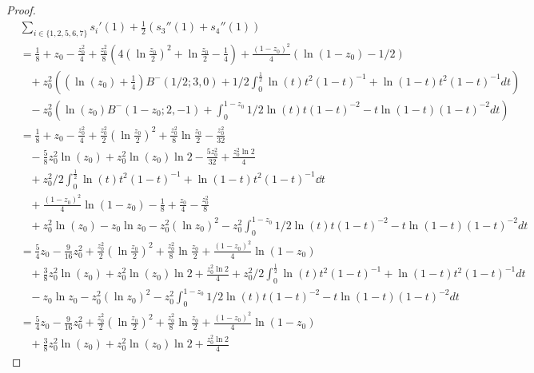 \begin{proof}
\begin{align*}
&\sum_{i \in\{1,2,5,6,7\}} s_i'(1)+\frac{1}{2}(s_3''(1)+s_4''(1))\\
	&=\frac{1}{8}+z_0-\frac{z_0^2}{4}+\frac{z_0^2}{8}(4(\ln\frac{z_0}{2})^2+\ln\frac{z_0}{2} - \frac{1}{4}) 
		+\frac{(1-z_0)^2}{4} (\ln(1-z_0)-1/2 )\\
	&\hspace{10pt}+z_0^2\left(\left(\ln(z_0)+\frac{1}{4}\right) B^-(1/2;3,0)+1/2\int_0^{\frac{1}{2}} 
		\ln(t)t^2(1-t)^{-1}+\ln(1-t)t^2(1-t)^{-1}dt \right) \\
	&\hspace{10pt}- z_0^{2}\left(\ln(z_0)B^-(1-z_0;2,-1)+\int_0^{1-z_0} 1/2\ln(t)t(1-t)^{-2}-t\ln(1-t)(1-t)^{-2}dt \right) \\
	&=\frac{1}{8}+z_0-\frac{z_0^2}{4}+\frac{z_0^2}{2}(\ln\frac{z_0}{2})^2
		+\frac{z_0^2}{8}\ln\frac{z_0}{2} - \frac{z_0^2}{32} \\
	&\hspace{10pt}-\frac{5}{8}z_0^2\ln(z_0)+z_0^2\ln(z_0)\ln 2-\frac{5z_0^2}{32} +\frac{z_0^2 \ln2}{4}\\
	&\hspace{10pt}+z_0^2/2\int_0^{\frac{1}{2}} \ln(t)t^2(1-t)^{-1}+\ln(1-t)t^2(1-t)^{-1}\dd t \\
	&\hspace{10pt}+\frac{(1-z_0)^2}{4}\ln(1-z_0) -\frac{1}{8}+\frac{z_0}{4}-\frac{z_0^2}{8}\\
	&\hspace{10pt}+ z_0^2\ln(z_0)-z_0 \ln z_0-z_0^2(\ln z_0)^2
		-z_0^2\int_0^{1-z_0} 1/2\ln(t)t(1-t)^{-2}-t\ln(1-t)(1-t)^{-2}dt \\
	&=\frac{5}{4}z_0-\frac{9}{16}z_0^2 +\frac{z_0^2}{2}(\ln\frac{z_0}{2})^2+\frac{z_0^2}{8}\ln\frac{z_0}{2} 
		+\frac{(1-z_0)^2}{4}\ln(1-z_0) \\
	&\hspace{10pt}+\frac{3}{8}z_0^2\ln(z_0)+z_0^2\ln(z_0)\ln 2+\frac{z_0^2 \ln2}{4}
		+z_0^2/2\int_0^{\frac{1}{2}} \ln(t)t^2(1-t)^{-1}+\ln(1-t)t^2(1-t)^{-1}dt \\
	&\hspace{10pt}-z_0 \ln z_0-z_0^2(\ln z_0)^2-z_0^2\int_0^{1-z_0} 1/2\ln(t)t(1-t)^{-2}-t\ln(1-t)(1-t)^{-2}dt \\
	&=\frac{5}{4}z_0-\frac{9}{16}z_0^2 +\frac{z_0^2}{2}(\ln\frac{z_0}{2})^2+\frac{z_0^2}{8}\ln\frac{z_0}{2} 
		+\frac{(1-z_0)^2}{4}\ln(1-z_0) \\
	&\hspace{10pt}+\frac{3}{8}z_0^2\ln(z_0)+z_0^2\ln(z_0)\ln 2+\frac{z_0^2 \ln2}{4}

\end{align*}
\end{proof}
